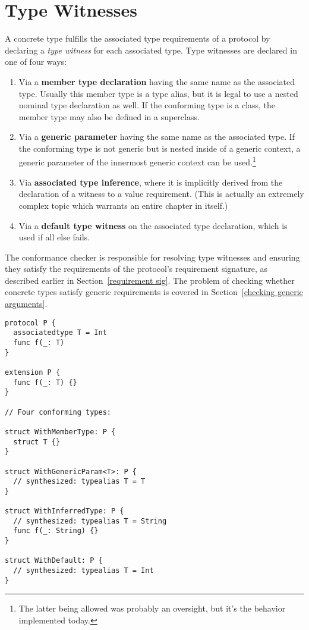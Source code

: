 \documentclass[../generics]{subfiles}
\begin{document}
\section{Type Witnesses}\label{type witnesses}

A concrete type fulfills the associated type requirements of a protocol by declaring a \emph{type witness} for each associated type. Type witnesses are declared in one of four ways:
\begin{enumerate}
\item Via a \textbf{member type declaration} having the same name as the associated type. Usually this member type is a type alias, but it is legal to use a nested nominal type declaration as well. If the conforming type is a class, the member type may also be defined in a superclass.
\item Via a \textbf{generic parameter} having the same name as the associated type. If the conforming type is not generic but is nested inside of a generic context, a generic parameter of the innermost generic context can be used.\footnote{The latter being allowed was probably an oversight, but it's the behavior implemented today.}
\item Via \textbf{associated type inference}, where it is implicitly derived from the declaration of a witness to a value requirement. (This is actually an extremely complex topic which warrants an entire chapter in itself.)
\item Via a \textbf{default type witness} on the associated type declaration, which is used if all else fails.
\end{enumerate}
The conformance checker is responsible for resolving type witnesses and ensuring they satisfy the requirements of the protocol's requirement signature, as described earlier in Section~\ref{requirement sig}. The problem of checking whether concrete types satisfy generic requirements is covered in Section~\ref{checking generic arguments}.

\begin{listing}\label{type witness listing}
\begin{Verbatim}
protocol P {
  associatedtype T = Int
  func f(_: T)
}

extension P {
  func f(_: T) {}
}

// Four conforming types:

struct WithMemberType: P {
  struct T {}
}

struct WithGenericParam<T>: P {
  // synthesized: typealias T = T
}

struct WithInferredType: P {
  // synthesized: typealias T = String
  func f(_: String) {}
}

struct WithDefault: P {
  // synthesized: typealias T = Int
}
\end{Verbatim}
\end{listing}
\end{document}
